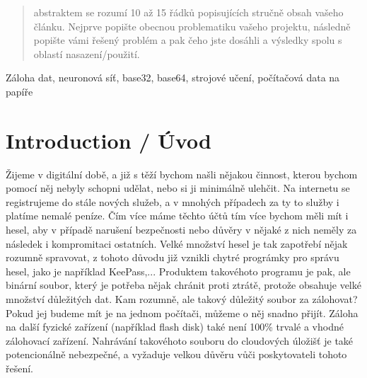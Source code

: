 \documentclass[conference]{IEEEtran}
\begin{document}
\maketitle

\begin{abstract}
abstraktem se rozumí 10 až 15 řádků popisujících stručně obsah vašeho článku. Nejprve popište obecnou problematiku vašeho projektu, následně popište vámi řešený problém a pak čeho jste dosáhli a výsledky spolu s oblastí nasazení/použití.
\end{abstract}

\begin{IEEEkeywords}
	Záloha dat, neuronová síť, base32, base64, strojové učení, počítačová data na papíře
\end{IEEEkeywords}



%
\IEEEpeerreviewmaketitle

\section{Introduction / Úvod}

Žijeme v digitální době, a již s těží bychom našli nějakou činnost, kterou bychom pomocí něj nebyly schopni udělat, nebo si ji minimálně ulehčit.  Na internetu se registrujeme do stále nových služeb, a v mnohých případech za ty to služby i platíme nemalé peníze. Čím více máme těchto účtů tím více bychom měli mít i hesel, aby v případě narušení bezpečnosti nebo důvěry v nějaké z nich neměly za následek i kompromitaci ostatních. Velké množství hesel je tak zapotřebí nějak rozumně spravovat, z tohoto důvodu již vznikli chytré prográmky pro správu hesel, jako je například KeePass,... Produktem takovéhoto programu je pak, ale binární soubor, který je potřeba nějak chránit proti ztrátě, protože obsahuje velké množství důležitých dat. Kam rozumně, ale takový důležitý soubor za zálohovat? Pokud jej budeme mít je na jednom počítači, můžeme o něj snadno přijít. Záloha na další fyzické zařízení (například flash disk) také není 100\% trvalé a vhodné zálohovací zařízení. Nahrávání takovéhoto souboru do cloudových úložišť je také potencionálně nebezpečné, a vyžaduje velkou důvěru vůči poskytovateli tohoto řešení. 
\end{document}
